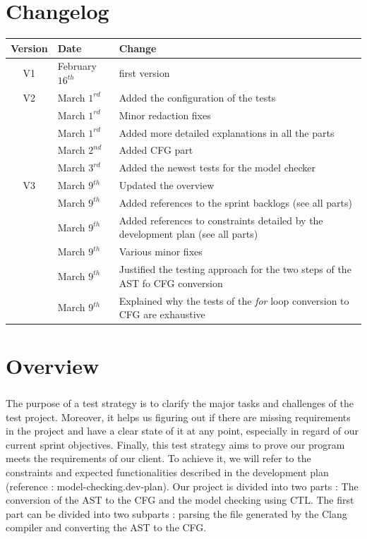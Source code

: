 \documentclass{report}
\begin{document}
\chapter* {Changelog}
\begin{center}
\begin{tabular}{|c|l|l|}
  \hline
  Version & Date & Change  \\
  \hline
  V1 & February $16^{th}$ & first version \\
  \hline
  V2 & March $1^{rd}$  & Added the configuration of the tests \\
  & March $1^{rd}$  & Minor redaction fixes \\
  & March $1^{rd}$  & Added more detailed explanations in all the parts \\
  & March $2^{nd}$  & Added CFG part \\
  & March $3^{rd}$  & Added the newest tests for the model checker \\
  \hline
  V3 & March $9^{th}$  & Updated the overview \\
  & March $9^{th}$  & Added references to the sprint backlogs (see all parts)  \\
  & March $9^{th}$  & Added references to constraints detailed by the development plan (see all parts) \\
  & March $9^{th}$ & Various minor fixes \\
  & March $9^{th}$ & Justified the testing approach for the two steps of the AST fo CFG conversion \\
  & March $9^{th}$ & Explained why the tests of the \textit{for} loop conversion to CFG are exhaustive\\
  \hline
\end{tabular}
\end{center}
\chapter* {Overview}
\paragraph{}
\hspace{4mm}The purpose of a test strategy is to clarify the major tasks and challenges of the test project.
Moreover, it helps us figuring out if there are missing requirements in the project and have a clear state of it at any point, especially in regard of our current sprint objectives.
Finally, this test strategy aims to prove our program meets the requirements of our client. To achieve it, 
we will refer to the constraints and expected functionalities described in the development plan (reference : model-checking.dev-plan).
Our project is divided into two parts : The conversion of the AST to the CFG and the model checking using CTL.
The first part can be divided into two subparts : parsing the file generated by the Clang compiler and converting the AST to the CFG.
\end{document}
